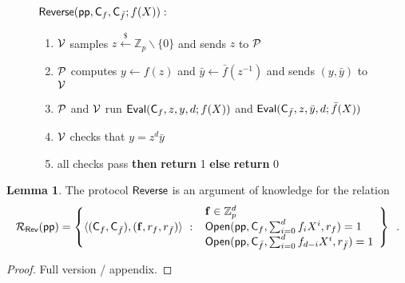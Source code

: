 \documentclass{article}
\theoremstyle{definition}
\newtheorem{lemma}{Lemma}
\begin{document}
\begin{figure}[!htp]
\noindent\begin{mdframed}[userdefinedwidth=\textwidth]
\begin{minipage}{\textwidth}
	\begin{flushleft}
	$\textsf{{Reverse}}(\textsf{pp}, \mathsf{C}_{f}, \mathsf{C}_{\bar{f}}; {f}(X)):$ 
		\begin{enumerate}[nolistsep]
		    \item $\mathcal{V}$ samples $z \xleftarrow{\$} \mathbb{Z}_p \backslash \{0\}$ and sends $z$ to $\mathcal{P}$
		    \item $\mathcal{P}$ computes $y \leftarrow f(z)$ and $\bar{y} \leftarrow \bar{f}(z^{-1})$ and sends $(y, \bar{y})$ to $\mathcal{V}$
		    \item $\mathcal{P}$ and $\mathcal{V}$ run $\textsf{{Eval}}(\mathsf{C}_f, z, y, d; f(X))$ and $\textsf{{Eval}}(\mathsf{C}_{\bar{f}}, z, \bar{y}, d; \bar{f}(X))$ 
		    \item $\mathcal{V}$ checks that $y = z^d \bar{y}$
		    \item \pcif{}all checks pass \textbf{then} \textbf{return} 1 \textbf{else} \textbf{return} 0
		\end{enumerate}
	\end{flushleft}
\end{minipage}
\end{mdframed}
\end{figure}

\begin{lemma}
    The protocol $\textsf{{Reverse}}$ is an argument of knowledge for the relation 
    \[
        \mathcal{R}_\mathsf{Rev}(\textsf{pp}) = \left\{
            \langle ( \mathsf{C}_f, \mathsf{C}_{\bar{f}} ), (\mathbf{f}, r_f, r_{\bar{f}})\rangle \ : \ \begin{array}{l}
                \mathbf{f} \in \mathbb{Z}_p^d \\
                \textsf{{Open}}(\textsf{pp}, \mathsf{C}_f, \sum_{i=0}^d f_i X^i, r_f) = 1 \\
                \textsf{{Open}}(\textsf{pp}, \mathsf{C}_{\bar{f}}, \sum_{i=0}^d f_{d-i} X^i, r_{\bar{f}}) = 1 
            \end{array}
        \right\} \enspace .
    \]
\end{lemma}

\begin{proof}
Full version / appendix.
\end{proof}
\end{document}

